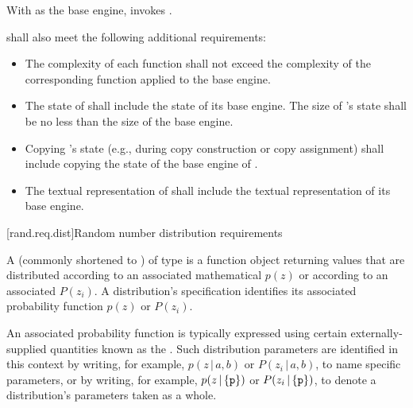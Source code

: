 \begin{itemdescr}
\pnum
\effects
 With  as the base engine, invokes .
\end{itemdescr}

\pnum
{} shall also meet
the following additional requirements:
\begin{itemize}
 \item
   The complexity
   of each function
   shall not exceed the complexity
   of the corresponding function
   applied to the base engine.
 \item
   The state
   of 
   shall include the state
   of its base engine.
   The size of 's state
   shall be no less than the size of the base engine.
 \item
   Copying 's state
   (e.g., during copy construction or copy assignment)
   shall include copying
   the state of the base engine of .
 \item
   The textual representation
   of 
   shall include
   the textual representation of its base engine.
\end{itemize}


[rand.req.dist]{Random number distribution requirements}%
%

\pnum
A 
(commonly shortened to )
 of type 
is a function object
returning values
that are distributed according to
an associated mathematical 
$p(z)$
or according to
an associated 
$P(z_i)$.
A distribution's specification
identifies its associated probability function
$p(z)$ or $P(z_i)$.

\pnum
An associated probability function is typically expressed
using certain externally-supplied quantities
known as the .
Such distribution parameters are identified
in this context by writing, for example,
  $p(z\,|\,a,b)$ or $P(z_i\,|\,a,b)$,
  to name specific parameters,
or by writing, for example,
  $p(z\,|\left\{\texttt{\protect p}\right\})$
  or $P(z_i\,|\left\{\texttt{\protect p}\right\})$,
  to denote a distribution's parameters  taken as a whole.

